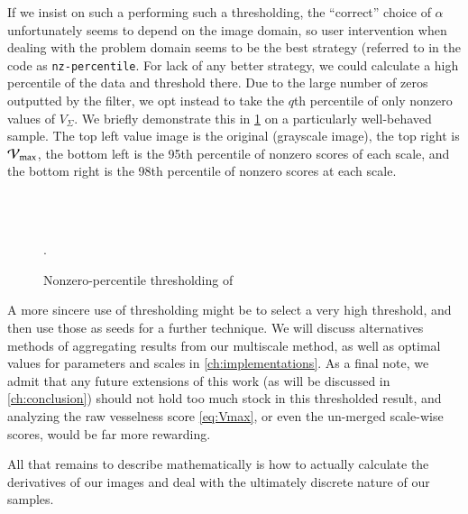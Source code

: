     If we insist on such a performing such a thresholding, the ``correct'' choice of $\alpha$ unfortunately seems to depend on the image domain, so user intervention when dealing with the problem domain seems to be the best strategy (referred to in the code as \texttt{nz-percentile}. For lack of any better strategy, we could calculate a high percentile of the data and threshold there. Due to the large number of zeros outputted by the filter, we opt instead to take the $q$th percentile of only nonzero values of $V_\Sigma$.
	We briefly demonstrate this in \cref{fig:qthresh_demo} on a particularly well-behaved sample. The top left value image is the original (grayscale image), the top right is $\mathcal{V}_{\max}$, the bottom left is the 95th percentile of nonzero scores of each scale, and the bottom right is the 98th percentile of nonzero scores at each scale.
	
	\begin{figure} \centering
		 \;
		 \\
		 \;
		 \\
		\caption{Nonzero-percentile thresholding of \Vmax}.
		\label{fig:qthresh_demo}
	\end{figure}
A more sincere use of thresholding might be to select a very high threshold, and then use those as seeds for a further technique.
	We will discuss alternatives methods of aggregating results from our multiscale method, as well as optimal values for parameters and scales
	in \cref{ch:implementations}. As a final note, we admit that any future extensions of this work (as will be discussed in \cref{ch:conclusion}) should not hold too much stock in this thresholded result, and analyzing the 
	raw vesselness score \cref{eq:Vmax}, or even
	the un-merged scale-wise scores, would be far more
	rewarding.    
	

All that remains to describe mathematically is how to actually calculate the derivatives of our images and deal with the ultimately discrete nature of our samples.    
